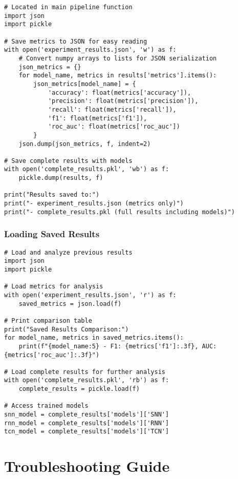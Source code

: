 \documentclass[12pt,a4paper]{article}
\begin{document}
\begin{lstlisting}[caption={Results Persistence Code}]
# Located in main pipeline function
import json
import pickle

# Save metrics to JSON for easy reading
with open('experiment_results.json', 'w') as f:
    # Convert numpy arrays to lists for JSON serialization
    json_metrics = {}
    for model_name, metrics in results['metrics'].items():
        json_metrics[model_name] = {
            'accuracy': float(metrics['accuracy']),
            'precision': float(metrics['precision']),
            'recall': float(metrics['recall']),
            'f1': float(metrics['f1']),
            'roc_auc': float(metrics['roc_auc'])
        }
    json.dump(json_metrics, f, indent=2)

# Save complete results with models
with open('complete_results.pkl', 'wb') as f:
    pickle.dump(results, f)

print("Results saved to:")
print("- experiment_results.json (metrics only)")
print("- complete_results.pkl (full results including models)")
\end{lstlisting}

\subsubsection{Loading Saved Results}

\begin{lstlisting}[caption={Results Loading Code}]
# Load and analyze previous results
import json
import pickle

# Load metrics for analysis
with open('experiment_results.json', 'r') as f:
    saved_metrics = json.load(f)

# Print comparison table
print("Saved Results Comparison:")
for model_name, metrics in saved_metrics.items():
    print(f"{model_name:5} - F1: {metrics['f1']:.3f}, AUC: {metrics['roc_auc']:.3f}")

# Load complete results for further analysis
with open('complete_results.pkl', 'rb') as f:
    complete_results = pickle.load(f)

# Access trained models
snn_model = complete_results['models']['SNN']
rnn_model = complete_results['models']['RNN']
tcn_model = complete_results['models']['TCN']
\end{lstlisting}

\section{Troubleshooting Guide}
\end{document}
